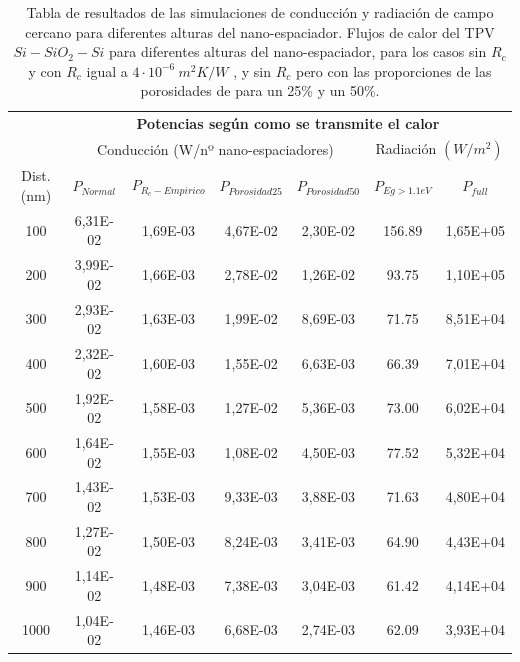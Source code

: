 \begin{table}[H]
	\centering
		\begin{tabular}{|c||c|c|c|c||c|c|}
		\hline
			\multirow{2}{*}{ }& \multicolumn{6}{c|}{\textbf{\large Potencias según como se transmite el calor}}\\ \cline{2-7}
		  & \multicolumn{4}{c||}{Conducción (W/nº nano-espaciadores)}& \multicolumn{2}{c|}{Radiación $(W/m^2)$}\\ \hline
			Dist. (nm)&$P_{Normal}$&$P_{R_c-Empirico}$&$P_{Porosidad25}$&$P_{Porosidad50}$&$P_{Eg>1.1eV}$&$P_{full}$\\ \hline \hline
			100&6,31E-02&1,69E-03&4,67E-02&2,30E-02&156.89&1,65E+05\\ \hline
			200&3,99E-02&1,66E-03&2,78E-02&1,26E-02&93.75&1,10E+05\\ \hline
			300&2,93E-02&1,63E-03&1,99E-02&8,69E-03&71.75&8,51E+04\\ \hline
			400&2,32E-02&1,60E-03&1,55E-02&6,63E-03&66.39&7,01E+04\\ \hline
			500&1,92E-02&1,58E-03&1,27E-02&5,36E-03&73.00&6,02E+04\\ \hline
			600&1,64E-02&1,55E-03&1,08E-02&4,50E-03&77.52&5,32E+04\\ \hline
			700&1,43E-02&1,53E-03&9,33E-03&3,88E-03&71.63&4,80E+04\\ \hline
			800&1,27E-02&1,50E-03&8,24E-03&3,41E-03&64.90&4,43E+04\\ \hline
			900&1,14E-02&1,48E-03&7,38E-03&3,04E-03&61.42&4,14E+04\\ \hline
		 1000&1,04E-02&1,46E-03&6,68E-03&2,74E-03&62.09&3,93E+04\\ \hline
		\end{tabular}
	\caption{Tabla de resultados de las simulaciones de conducción y radiación de campo cercano para diferentes alturas del nano-espaciador. Flujos de calor del TPV $Si-SiO_2-Si$ para diferentes alturas del nano-espaciador, para los casos sin $R_c$ y con $R_c$ igual a $4 \cdot 10^{-6} \ m^2 K/W$ \cite{nf_TPV_Pillars_SiO2}, y sin $R_c$ pero con las proporciones de las porosidades de \cite{ThermalConductivity_SiO2_2018} para un 25\% y un 50\%.}
	\label{tab:condTerSiSiO2Si}
\end{table}

